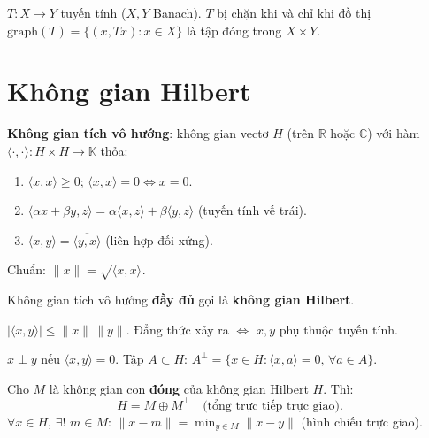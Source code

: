 \documentclass[12pt,a4paper]{article}
\begin{document}
\begin{dinhly}[title={Định lý đồ thị đóng}]
  $T: X \to Y$ tuyến tính ($X, Y$ Banach). $T$ bị chặn khi và chỉ khi đồ thị $\text{graph}(T) = \{(x, Tx) : x \in X\}$ là tập đóng trong $X \times Y$.
\end{dinhly}

\section{Không gian Hilbert}

\begin{dinhnghia}[title={Tích vô hướng}]
  \textbf{Không gian tích vô hướng}: không gian vectơ $H$ (trên $\mathbb{R}$ hoặc $\mathbb{C}$) với hàm $\langle \cdot, \cdot \rangle: H \times H \to \mathbb{K}$ thỏa:
  \begin{enumerate}
    \item $\langle x, x \rangle \ge 0$; \;$\langle x, x \rangle = 0 \Leftrightarrow x = 0$.
    \item $\langle \alpha x + \beta y, z \rangle = \alpha\langle x, z \rangle + \beta\langle y, z \rangle$ (tuyến tính vế trái).
    \item $\langle x, y \rangle = \overline{\langle y, x \rangle}$ (liên hợp đối xứng).
  \end{enumerate}
  Chuẩn: $\|x\| = \sqrt{\langle x, x \rangle}$.
\end{dinhnghia}

\begin{dinhnghia}[title={Không gian Hilbert}]
  Không gian tích vô hướng \textbf{đầy đủ} gọi là \textbf{không gian Hilbert}.
\end{dinhnghia}

\begin{dinhly}[title={Bất đẳng thức Cauchy--Schwarz}]
  $|\langle x, y \rangle| \le \|x\|\,\|y\|$. Đẳng thức xảy ra $\Leftrightarrow$ $x, y$ phụ thuộc tuyến tính.
\end{dinhly}

\begin{dinhnghia}[title={Trực giao}]
  $x \perp y$ nếu $\langle x, y \rangle = 0$. Tập $A \subset H$: $A^\perp = \{x \in H : \langle x, a \rangle = 0,\, \forall a \in A\}$.
\end{dinhnghia}

\begin{dinhly}[title={Định lý hình chiếu}]
  Cho $M$ là không gian con \textbf{đóng} của không gian Hilbert $H$. Thì:
  \[
    H = M \oplus M^\perp \quad\text{(tổng trực tiếp trực giao)}.
  \]
  $\forall x \in H$, $\exists!$ $m \in M$: $\|x - m\| = \min_{y \in M}\|x - y\|$ (hình chiếu trực giao).
\end{dinhly}
\end{document}
